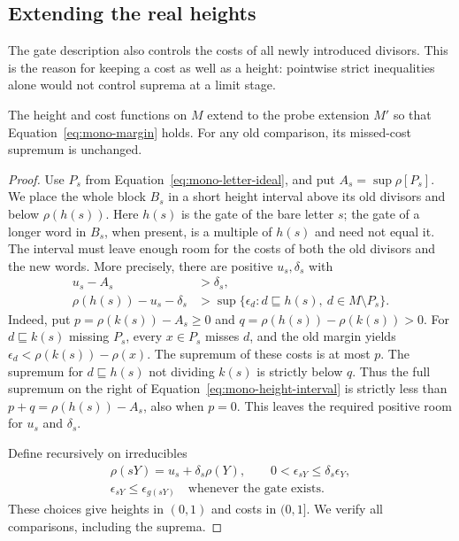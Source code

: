 \subsection{Extending the real heights}

The gate description also controls the costs of all newly introduced
divisors.  This is the reason for keeping a cost as well as a height:
pointwise strict inequalities alone would not control suprema at a
limit stage.

\begin{lemma}\label{lem:mono-probe-heights}
The height and cost functions on $M$ extend to the probe extension
$M'$ so that Equation~\eqref{eq:mono-margin} holds.  For any old
comparison, its missed-cost supremum is unchanged.
\end{lemma}
\begin{proof}
Use $P_s$ from Equation~\eqref{eq:mono-letter-ideal}, and put
$A_s=\sup\rho[P_s]$.  We place the whole block $B_s$ in a short
height interval above its old divisors and below $\rho(h(s))$.
Here $h(s)$ is the gate of the bare letter $s$; the gate of a longer
word in $B_s$, when present, is a multiple of $h(s)$ and need not
equal it.  The interval must leave enough room for the costs of both
the old divisors and the new words.  More precisely, there are
positive $u_s,\delta_s$ with
\begin{equation}\label{eq:mono-height-interval}
 \begin{split}
 u_s-A_s&>\delta_s,\\
 \rho(h(s))-u_s-\delta_s
  &>\sup\{\epsilon_d:d\sqsubseteq h(s),\ d\in M\setminus P_s\}.
 \end{split}
\end{equation}
Indeed, put $p=\rho(k(s))-A_s\geq0$ and
$q=\rho(h(s))-\rho(k(s))>0$.  For $d\sqsubseteq k(s)$ missing
$P_s$, every $x\in P_s$ misses $d$, and the old margin yields
$\epsilon_d<\rho(k(s))-\rho(x)$.  The supremum of these costs is
at most $p$.  The supremum for $d\sqsubseteq h(s)$ not dividing
$k(s)$ is strictly below $q$.  Thus the full supremum on the right
of Equation~\eqref{eq:mono-height-interval} is strictly less than
$p+q=\rho(h(s))-A_s$, also when $p=0$.  This leaves the required
positive room for $u_s$ and $\delta_s$.

Define recursively on irreducibles
\begin{equation}\label{eq:mono-probe-height-definition}
 \begin{gathered}
 \rho(sY)=u_s+\delta_s\rho(Y),\qquad
 0<\epsilon_{sY}\leq\delta_s\epsilon_Y,\\
 \epsilon_{sY}\leq\epsilon_{g(sY)}
       \quad\text{whenever the gate exists}.
 \end{gathered}
\end{equation}
These choices give heights in $(0,1)$ and costs in $(0,1]$.
We verify all comparisons, including the suprema.


\end{proof}
